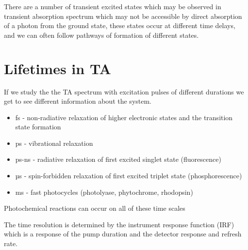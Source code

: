 \documentclass[
]{book}
\providecommand{\tightlist}{%
  \setlength{\itemsep}{0pt}\setlength{\parskip}{0pt}}
\begin{document}
There are a number of transient excited states which may be observed in transient absorption spectrum which may not be accessible by direct absorption of a photon from the ground state, these states occur at different time delays, and we can often follow pathways of formation of different states.

\hypertarget{lifetimes-in-ta}{%
\section{Lifetimes in TA}\label{lifetimes-in-ta}}

If we study the the TA spectrum with excitation pulses of different durations we get to see different information about the system.

\begin{itemize}
\tightlist
\item
  fs - non-radiative relaxation of higher electronic states and the transition state formation
\item
  ps - vibrational relaxation
\item
  ps-ns - radiative relaxation of first excited singlet state (fluorescence)
\item
  µs - spin-forbidden relaxation of first excited triplet state (phosphorescence)
\item
  ms - fast photocycles (photolyase, phytochrome, rhodopsin)
\end{itemize}

Photochemical reactions can occur on all of these time scales

The time resolution is determined by the instrument response function (IRF) which is a response of the pump duration and the detector response and refresh rate.

  
\end{document}
